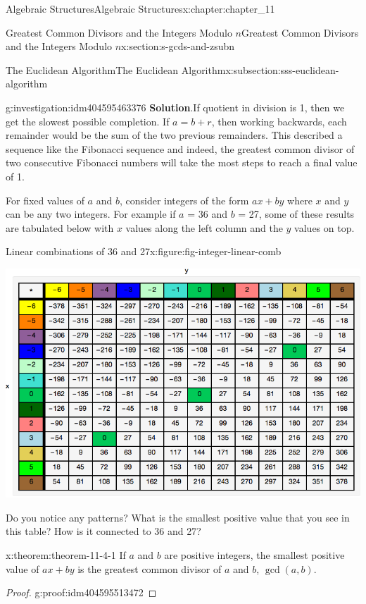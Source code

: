 \documentclass[twoside,10pt,]{book}
\newcommand{\blocktitlefont}{\relax}
\numberwithin{equation}{section}
\begin{document}
\begin{chapterptx}{Algebraic Structures}{}{Algebraic Structures}{}{}{x:chapter:chapter_11}
\begin{sectionptx}{Greatest Common Divisors  and the Integers Modulo \(n\)}{}{Greatest Common Divisors  and the Integers Modulo \(n\)}{}{}{x:section:s-gcds-and-zsubn}
\begin{subsectionptx}{The Euclidean Algorithm}{}{The Euclidean Algorithm}{}{}{x:subsection:sss-euclidean-algorithm}
\begin{investigation}{}{g:investigation:idm404595463376}
\noindent\textbf{\blocktitlefont Solution}.\label{g:solution:idm404595488240}{}\hypertarget{g:solution:idm404595488240}{}\quad{}If quotient in division is 1, then we get the slowest possible completion.   If \(a = b + r\), then working backwards, each remainder would be the sum of the two previous remainders.  This described a sequence like the Fibonacci sequence and indeed, the greatest common divisor of two consecutive Fibonacci numbers will take the most steps to reach a final value of 1.%
\end{investigation}
For fixed values of \(a\) and \(b\), consider integers of the form \(a x+b y\) where \(x\) and \(y\) can be any two integers.  For example if \(a\) = 36 and \(b\) = 27,  some of these results are tabulated below with \(x\) values along the left column and the \(y\) values on top.%
\begin{figureptx}{Linear combinations of 36 and 27}{x:figure:fig-integer-linear-comb}{}%
\begin{image}{0.125}{0.75}{0.125}%
\includegraphics[width=\linewidth]{images/fig-integer-linear-comb.png}
\end{image}%
\tcblower
\end{figureptx}%
Do you notice any patterns?   What is the smallest positive value that you see in this table?  How is it connected to 36 and 27?%
\begin{theorem}{}{}{x:theorem:theorem-11-4-1}%
If \(a\) and \(b\) are positive integers, the smallest positive value of \(a x + b y\) is the greatest common divisor of \(a\) and \(b\), \(\gcd(a,b)\).%
\end{theorem}
\begin{proof}{}{g:proof:idm404595513472}

\end{proof}
\end{subsectionptx}
\end{sectionptx}
\end{chapterptx}
\end{document}
